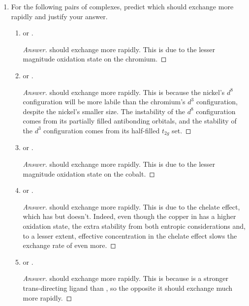 \documentclass[../psets.tex]{subfiles}
\begin{document}
\begin{enumerate}
    \item {}For the following pairs of complexes, predict which should exchange more rapidly and justify your answer.
    \begin{enumerate}
        \item {} or .
        \begin{proof}[Answer]
             should exchange more rapidly. This is due to the lesser magnitude oxidation state on the chromium.
        \end{proof}
        \item {} or .
        \begin{proof}[Answer]
             should exchange more rapidly. This is because the nickel's $d^8$ configuration will be more labile than the chromium's $d^3$ configuration, despite the nickel's smaller size. The instability of the $d^8$ configuration comes from its partially filled antibonding orbitals, and the stability of the $d^3$ configuration comes from its half-filled $t_{2g}$ set.
        \end{proof}
        \item {} or .
        \begin{proof}[Answer]
             should exchange more rapidly. This is due to the lesser magnitude oxidation state on the cobalt.
        \end{proof}
        \item {} or .
        \begin{proof}[Answer]
             should exchange more rapidly. This is due to the chelate effect, which  has but  doesn't. Indeed, even though the copper in  has a higher oxidation state, the extra stability from both entropic considerations and, to a lesser extent, effective concentration in the chelate effect slows the exchange rate of  even more.
        \end{proof}
        \item \ce{[PtCl3NH3]-} or \ce{[Pt(CN)3NH3]-}.
        \begin{proof}[Answer]
            \ce{[Pt(CN)3NH3]-} should exchange more rapidly. This is because  is a stronger trans-directing ligand than , so the  opposite it should exchange much more rapidly.

\end{proof}
\end{enumerate}
\end{enumerate}
\end{document}
